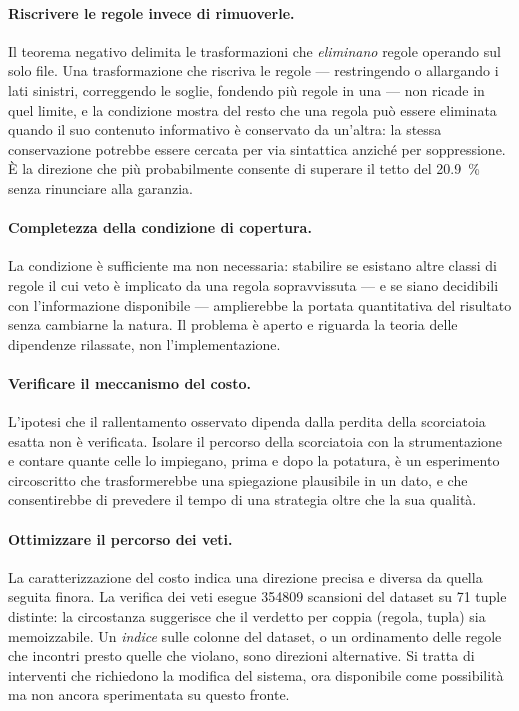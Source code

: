\paragraph{Riscrivere le regole invece di rimuoverle.}
Il teorema negativo delimita le trasformazioni che \emph{eliminano} regole operando sul solo file.
Una trasformazione che riscriva le regole --- restringendo o allargando i lati sinistri, correggendo
le soglie, fondendo più regole in una --- non ricade in quel limite, e la condizione \Vtwo{} mostra
del resto che una regola può essere eliminata quando il suo contenuto informativo è conservato da
un'altra: la stessa conservazione potrebbe essere cercata per via sintattica anziché per
soppressione. È la direzione che più probabilmente consente di superare il tetto del
\SI{20.9}{\percent} senza rinunciare alla garanzia.

\paragraph{Completezza della condizione di copertura.}
La condizione \Vtwo{} è sufficiente ma non necessaria: stabilire se esistano altre classi di
regole il cui veto è implicato da una regola sopravvissuta --- e se siano decidibili con
l'informazione disponibile --- amplierebbe la portata quantitativa del risultato senza cambiarne la
natura. Il problema è aperto e riguarda la teoria delle dipendenze rilassate, non
l'implementazione.

\paragraph{Verificare il meccanismo del costo.}
L'ipotesi che il rallentamento osservato dipenda dalla perdita della scorciatoia esatta non è
verificata. Isolare il percorso della scorciatoia con la strumentazione e contare quante celle lo
impiegano, prima e dopo la potatura, è un esperimento circoscritto che trasformerebbe una
spiegazione plausibile in un dato, e che consentirebbe di prevedere il tempo di una strategia
oltre che la sua qualità.

\paragraph{Ottimizzare il percorso dei veti.}
La caratterizzazione del costo indica una direzione precisa e diversa da quella seguita finora.
La verifica dei veti esegue \num{354809} scansioni del dataset su \num{71} tuple distinte: la
circostanza suggerisce che il verdetto per coppia (regola, tupla) sia memoizzabile. Un
\emph{indice} sulle colonne del dataset, o un ordinamento delle regole che incontri presto quelle
che violano, sono direzioni alternative. Si tratta di interventi che richiedono la modifica del
sistema, ora disponibile come possibilità ma non ancora sperimentata su questo fronte.

